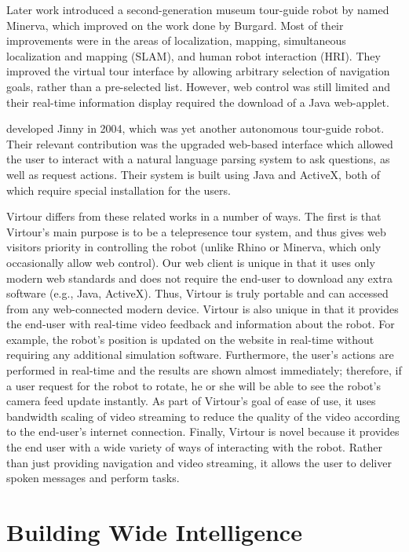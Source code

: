 \documentclass[
  oneside,
  11pt, a4paper,
  footinclude=true,
  headinclude=true,
  cleardoublepage=empty
]{article}
\begin{document}
Later work introduced a second-generation museum tour-guide robot by
\citet{thrun1999} named Minerva, which improved on the work done by Burgard.
Most of their improvements were in the areas of localization, mapping,
simultaneous localization and mapping (SLAM), and human robot interaction
(HRI). They improved the virtual tour interface by allowing arbitrary selection
of navigation goals, rather than a pre-selected list. However, web control was
still limited and their real-time information display required the download of
a Java web-applet.

\citet{kim2004} developed Jinny in 2004, which was yet another autonomous
tour-guide robot. Their relevant contribution was the upgraded web-based
interface which allowed the user to interact with a natural language parsing
system to ask questions, as well as request actions. Their system is built
using Java and ActiveX, both of which require special installation for the
users.

Virtour differs from these related works in a number of ways. The first is that
Virtour's main purpose is to be a telepresence tour system, and thus gives web
visitors priority in controlling the robot (unlike Rhino or Minerva, which only
occasionally allow web control). Our web client is unique in that it uses only
modern web standards and does not require the end-user to download any extra
software (e.g., Java, ActiveX). Thus, Virtour is truly portable and can accessed
from any web-connected modern device. Virtour is also unique in that it
provides the end-user with real-time video feedback and information about the
robot. For example, the robot's position is updated on the website in
real-time without requiring any additional simulation software. Furthermore,
the user's actions are performed in real-time and the results are shown almost
immediately; therefore, if a user request for the robot to rotate, he or she will be
able to see the robot's camera feed update instantly. As part of Virtour's
goal of ease of use, it uses bandwidth scaling of video streaming to reduce the
quality of the video according to the end-user's internet connection. Finally,
Virtour is novel because it provides the end user with a wide variety of ways
of interacting with the robot. Rather than just providing navigation and video
streaming, it allows the user to deliver spoken messages and perform tasks.

\section{Building Wide Intelligence}\label{sec:bwi}
\end{document}
